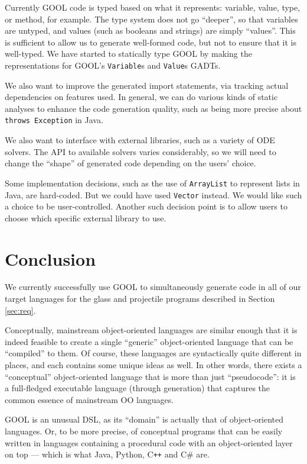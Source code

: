 \documentclass[sigplan,review,prologue,dvipsnames]{acmart}
\newcommand{\Csharp}{C\#}
\newcommand{\Cplusplus}{C\texttt{++}}
\begin{document}
Currently GOOL code is typed based on what it represents:
variable, value, type, or method, for example. The type system does not
go ``deeper'', so that variables are untyped, and values (such as booleans
and strings) are simply ``values''.  This is sufficient to allow us to
generate well-formed code, but not to ensure that it is well-typed.
We have started to statically type GOOL by making the
representations for GOOL's \verb|Variable|s and \verb|Value|s GADTs. 

We also want to improve the generated import statements, via tracking
actual dependencies on features used.  In general, we can do various 
kinds of static analyses to enhance the code generation quality,
such as being more precise about \verb|throws Exception| in Java.

We also want to interface with external libraries, such as a variety
of ODE solvers. The API to available solvers varies considerably, so
we will need to change the ``shape'' of generated code depending on
the users' choice.

Some implementation decisions, such as the use of \verb|ArrayList| to represent
lists in Java, are hard-coded. But we could have used \verb|Vector| instead.
We would like such a choice to be user-controlled. Another such decision
point is to allow users to choose which specific external library to use.

\section{Conclusion} \label{sec:conclusions}

We currently successfully use GOOL to simultaneously generate code in all of 
our target languages for the glass and projectile programs described in Section 
\ref{sec:req}. 

Conceptually, mainstream object-oriented languages are similar enough that it
is indeed feasible to create a single ``generic'' object-oriented language that
can be ``compiled'' to them.  Of course, these languages are syntactically
quite different in places, and each contains some unique ideas as well.
In other words, there exists a ``conceptual'' object-oriented language that
is more than just ``pseudocode'': it is a full-fledged executable language
(through generation) that captures the common essence of mainstream OO
languages.

GOOL is an unusual DSL, as its ``domain'' is actually that of object-oriented
languages. Or, to be more precise, of conceptual programs that can be
easily written in languages containing a procedural code with an
object-oriented layer on top --- which is what Java, Python, \Cplusplus{} and
\Csharp{} are.
\end{document}
